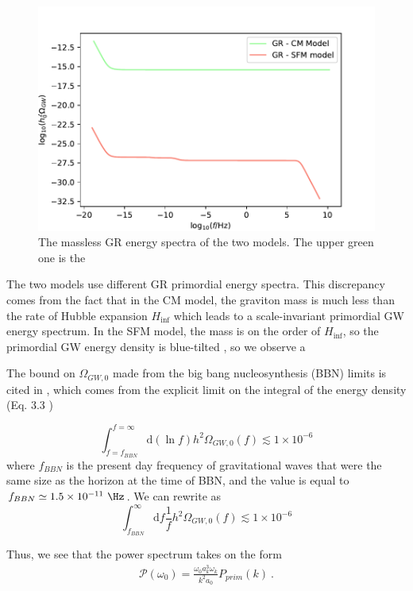 \begin{figure}[h]
    \centering
    \includegraphics[width=\linewidth]{fig/fig5.pdf} 
    \caption{The massless GR energy spectra of the two models. The upper green one is the  }
\end{figure}
The two models use different GR primordial energy spectra. This discrepancy comes from the fact that in the CM model, the graviton mass is much less than the rate of Hubble expansion $H_{\inf}$ which leads to a scale-invariant primordial GW energy spectrum. In the SFM model, the mass is on the order of $H_{\inf}$, so the primordial GW energy density is blue-tilted \cite{Fujita:2018}, so we observe a  

The bound on $\Omega_{GW,0}$ made from the big bang nucleosynthesis (BBN) limits is cited in \cite{Fujita:2018}, which comes from the explicit limit on the integral of the energy density (Eq. 3.3 \cite{Tanin:2021}) 

\begin{equation} \label{eq:1}
    \int_{f = f_{BBN}}^{f = \infty}\mbox{d}(\ln{f}) h^2\Omega_{GW,0}(f) \lesssim 1\times 10^{-6}
\end{equation} 
where $f_{BBN}$ is the present day frequency of gravitational waves that were the same size as the horizon at the time of BBN, and the value is equal to $f_{BBN} \simeq 1.5\times 10^{-11} \ \Hz$. We can rewrite  as 
\begin{equation} \label{eq:11}
    \int_{f_{BBN}}^{\infty}\mbox{d}f \frac{1}{f} h^2\Omega_{GW,0}(f) \lesssim 1\times 10^{-6}
\end{equation} 


Thus, we see that the power spectrum takes on the form 
\begin{equation}\label{eqn:18}
    \begin{multlined}
    \mathcal{P}(\omega_0)  = \frac{\omega_0 a_k^3 \omega_k}{k^2 a_0} P_{prim}(k)\ .
    \end{multlined}
\end{equation}




